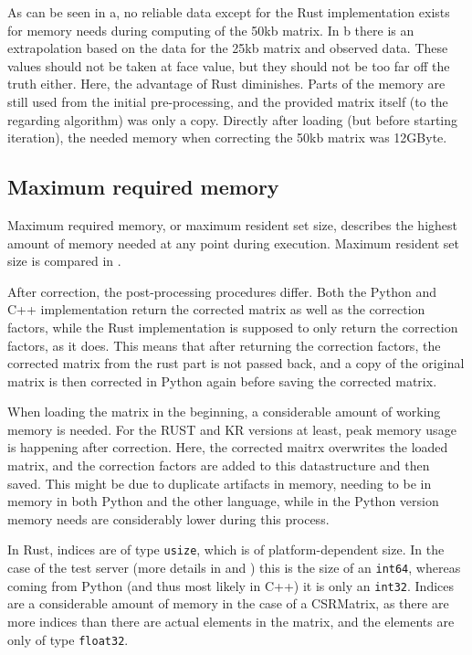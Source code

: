 As can be seen in a, no reliable data except for the Rust
implementation exists for memory needs during computing of the 50kb matrix. In
b there is an extrapolation based on the data for the
25kb matrix and observed data. These values should not be taken at face value,
but they should not be too far off the truth either. Here, the advantage of Rust
diminishes. Parts of the memory are still used from the initial pre-processing,
and the provided matrix itself (to the regarding algorithm) was only a copy.
Directly after loading (but before starting iteration), the needed memory when
correcting the 50kb matrix was 12GByte.


\subsection{Maximum required memory}\label{sec:maxmem}



Maximum required memory, or maximum resident set size, describes the highest
amount of memory needed at any point during execution. Maximum resident set size
is compared in .

After correction, the post-processing procedures differ. Both the Python and
C++ implementation return the corrected matrix as well as the correction
factors, while the Rust implementation is supposed to only return the
correction factors, as it does. This means that after returning the correction
factors, the corrected matrix from the rust part is not passed back, and a copy
of the original matrix is then corrected in Python again before saving the
corrected matrix.

When loading the matrix in the beginning, a considerable amount of working
memory is needed. For the RUST and KR versions at least, peak memory usage is
happening after correction. Here, the corrected maitrx overwrites the loaded
matrix, and the correction factors are added to this datastructure and then
saved. This might be due to duplicate artifacts in memory, needing to be in
memory in both Python and the other language, while in the Python version
memory needs are considerably lower during this process.

In Rust, indices are of type \verb|usize|, which is of platform-dependent size.
In the case of the test server (more details in  and
) this is the size of an \verb|int64|, whereas coming from
Python (and thus most likely in C++) it is only an \verb|int32|. Indices are a
considerable amount of memory in the case of a CSRMatrix, as there are more
indices than there are actual elements in the matrix, and the elements are only
of type \verb|float32|.

